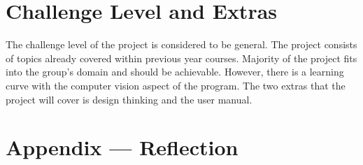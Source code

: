\documentclass{article}
\begin{document}
\section{Challenge Level and Extras}

The challenge level of the project is considered to be general. The project consists of topics 
already covered within previous year courses. Majority of the project fits into the group's domain
 and should be achievable. However, there is a learning curve with the computer vision aspect of 
 the program. The two extras that the project will cover is design thinking and the user manual.

\newpage{}

\section*{Appendix --- Reflection}

   
\end{document}
